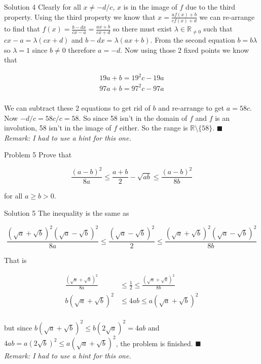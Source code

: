 \documentclass{article}
\begin{document}
\begin{solution}{Solution 4}
Clearly for all $x \neq -d/c$, $x$ is in the image of $f$ due to the third
property.
Using the third property we know that $x = \frac{af(x)+b}{cf(x)+d}$ we can
re-arrange to find that $f(x) = \frac{b-dx}{cx-a} = \frac{ax+b}{cx+d}$ so
there must exist $\lambda \in \mathbb{R}_{\neq 0}$ such that
$cx-a = \lambda (cx+d)$ and $b-dx = \lambda (ax+b)$. From the second
equation $b = b \lambda$ so $\lambda = 1$ since $b \neq 0$ therefore
$a=-d$. Now using those 2 fixed points we know that

\[
\begin{aligned}
19a + b = 19^2 c - 19a\\
97a + b = 97^2 c - 97a\\
\end{aligned}
\]

We can subtract these 2 equations to get rid of $b$ and re-arrange to get
$a = 58c$. Now $-d/c = 58c/c = 58$. So since 58 isn't in the domain of $f$
and $f$ is an involution, 58 isn't in the image of $f$ either. So the range
is $\mathbb{R} \setminus \{ 58 \}$. $\blacksquare$ \\

\textit{Remark: I had to use a hint for this one.}
\end{solution}

\vspace{0.2cm}
\begin{problem}{Problem 5}
Prove that

$$
\frac{(a-b)^2}{8a} \leq \frac{a+b}{2} - \sqrt{ab} \leq \frac{(a-b)^2}{8b}
$$

for all $a\geq b >0$.
\end{problem}

\begin{solution}{Solution 5}
The inequality is the same as

$$
\frac{(\sqrt{a} + \sqrt{b})^2(\sqrt{a} - \sqrt{b})^2}{8a} \leq
\frac{(\sqrt{a} - \sqrt{b})^2}{2} \leq
\frac{(\sqrt{a} + \sqrt{b})^2(\sqrt{a} - \sqrt{b})^2}{8b}
$$

That is

\[
\begin{aligned}
\frac{(\sqrt{a} + \sqrt{b})^2}{8a} &\leq
\frac{1}{2} \leq
\frac{(\sqrt{a} + \sqrt{b})^2}{8b} \\
b(\sqrt{a} + \sqrt{b})^2 &\leq
4ab \leq
a(\sqrt{a} + \sqrt{b})^2 \\
\end{aligned}
\]

but since $b(\sqrt{a} + \sqrt{b})^2 \leq b (2\sqrt{a})^2 = 4ab$ and
$4ab = a(2\sqrt{b})^2 \leq a(\sqrt{a} + \sqrt{b})^2$, the problem is
finished. $\blacksquare$ \\

\textit{Remark: I had to use a hint for this one.}
\end{solution}
\end{document}
